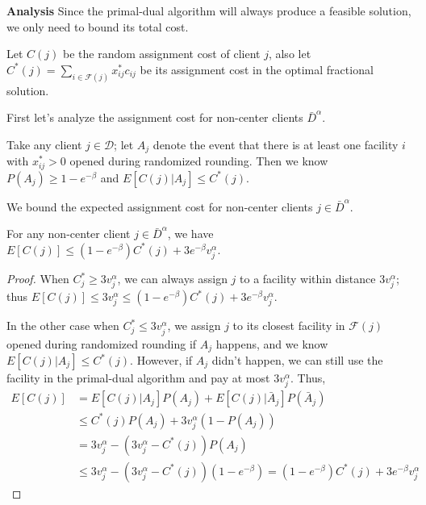 \textbf{Analysis}
Since the primal-dual algorithm will always produce a feasible solution, we only need to bound its total cost.

Let $C(j)$ be the random assignment cost of client $j$,
also let $C^*(j) = \sum_{i \in \mathcal{F}(j)} x_{ij}^* c_{ij}$ be its assignment cost in the optimal fractional solution.

First let's analyze the assignment cost for non-center clients $\bar D^\alpha$.

\begin{lem}
\cite{chudak2003improved} Take any client $j \in \mathcal{D}$;
let $A_j$ denote the event that there is at least one facility $i$ with $x^*_{ij} > 0$ opened during randomized rounding.
Then we know
$P(A_j) \ge 1 - e^{-\beta}$
and
$E[C(j) | A_j] \le C^*(j)$.
\end{lem}

We bound the expected assignment cost for non-center clients $j \in \bar D^\alpha$.

\begin{lem}
For any non-center client $j \in \bar D^\alpha$, we have
$E[C(j)] \le (1-e^{-\beta}) C^*(j) + 3e^{-\beta}v^\alpha_j$.
\end{lem}

\begin{proof}
When $C^*_j \ge 3 v^\alpha_j$, we can always assign $j$ to a facility within distance $3 v^\alpha_j$; thus
$E[C(j)] \le 3 v^\alpha_j \le (1-e^{-\beta}) C^*(j) + 3e^{-\beta}v^\alpha_j$. 

In the other case when $C^*_j \le 3 v^\alpha_j$, we assign $j$ to its closest facility in $\mathcal{F}(j)$
opened during randomized rounding if $A_j$ happens, and we know $E[C(j) | A_j] \le C^*(j)$.
However, if $A_j$ didn't happen, we can still use the facility in the primal-dual algorithm and pay at most $3v^\alpha_j$.
Thus,
\begin{align*}
E[C(j)] &= E[C(j)|A_j]P(A_j) + E[C(j)|\bar A_j]P(\bar A_j)  \\
&\le C^*(j)P(A_j) + 3v^\alpha_j (1 - P(A_j)) \\
&= 3v^\alpha_j - (3v^\alpha_j - C^*(j)) P(A_j) \\
&\le 3v^\alpha_j - (3v^\alpha_j - C^*(j)) (1 - e^{-\beta}) 
= (1-e^{-\beta}) C^*(j) + 3e^{-\beta}v^\alpha_j
\end{align*}
\end{proof}

